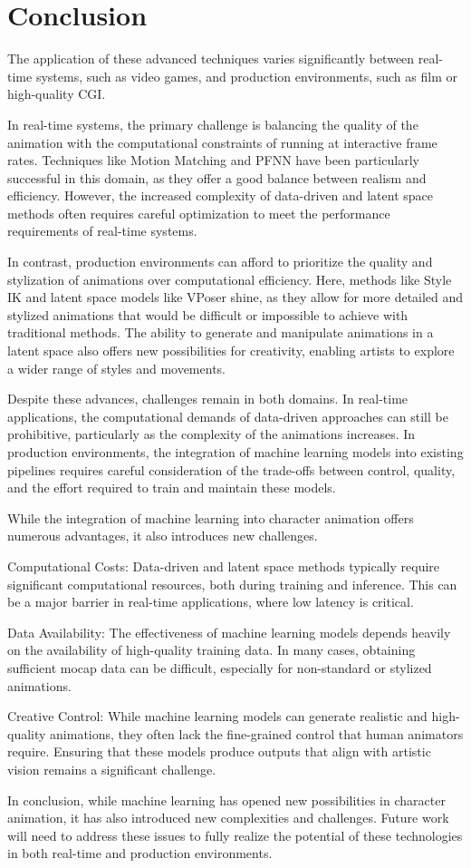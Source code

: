 \documentclass[../../main.tex]{subfiles}
\begin{document}
\section{Conclusion}

The application of these advanced techniques varies significantly between real-time systems, such as video games, and production environments, such as film or high-quality CGI.

In real-time systems, the primary challenge is balancing the quality of the animation with the computational constraints of running at interactive frame rates. Techniques like Motion Matching and PFNN have been particularly successful in this domain, as they offer a good balance between realism and efficiency. However, the increased complexity of data-driven and latent space methods often requires careful optimization to meet the performance requirements of real-time systems.

In contrast, production environments can afford to prioritize the quality and stylization of animations over computational efficiency. Here, methods like Style IK and latent space models like VPoser shine, as they allow for more detailed and stylized animations that would be difficult or impossible to achieve with traditional methods. The ability to generate and manipulate animations in a latent space also offers new possibilities for creativity, enabling artists to explore a wider range of styles and movements.

Despite these advances, challenges remain in both domains. In real-time applications, the computational demands of data-driven approaches can still be prohibitive, particularly as the complexity of the animations increases. In production environments, the integration of machine learning models into existing pipelines requires careful consideration of the trade-offs between control, quality, and the effort required to train and maintain these models.

While the integration of machine learning into character animation offers numerous advantages, it also introduces new challenges.

Computational Costs: Data-driven and latent space methods typically require significant computational resources, both during training and inference. This can be a major barrier in real-time applications, where low latency is critical.

Data Availability: The effectiveness of machine learning models depends heavily on the availability of high-quality training data. In many cases, obtaining sufficient mocap data can be difficult, especially for non-standard or stylized animations.

Creative Control: While machine learning models can generate realistic and high-quality animations, they often lack the fine-grained control that human animators require. Ensuring that these models produce outputs that align with artistic vision remains a significant challenge.

In conclusion, while machine learning has opened new possibilities in character animation, it has also introduced new complexities and challenges. Future work will need to address these issues to fully realize the potential of these technologies in both real-time and production environments.
\end{document}
